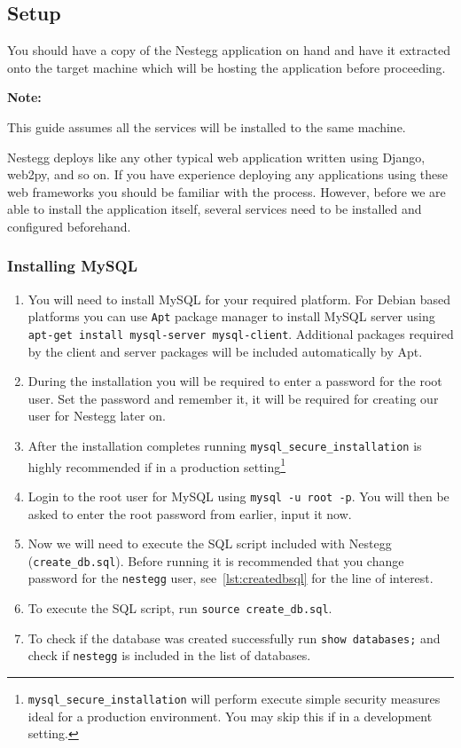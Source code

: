 \documentclass[11pt]{article}
\newcommand{\cmd}[1]{\textcolor{code}{\texttt{#1}}}
\newcommand\note[1]{
	\vspace{12pt}
	
	\begin{centering}
	\hfill
	\fcolorbox{black}{light-gray} 
    {
    \begin{minipage}{\textwidth}
    \vspace{4pt}
    	\textbf{Note:}
    	\vspace{8pt}
    	
    	#1
    \vspace{4pt}
    \end{minipage}
    }
    \hfill
    \end{centering}
    
    \vspace{12pt}
}
\begin{document}
		\subsection{Setup}
			You should have a copy of the Nestegg application on hand and have it extracted onto the target machine which will be hosting the application before proceeding.
			
			\note{This guide assumes all the services will be installed to the same machine.}
			Nestegg deploys like any other typical web application written using Django, web2py, and so on. If you have experience deploying any applications using these web frameworks you should be familiar with the process. However, before we are able to install the application itself, several services need to be installed and configured beforehand.			
			
			\subsubsection{Installing MySQL}
				\begin{enumerate}
					\item You will need to install MySQL for your required platform. For Debian based platforms you can use \texttt{Apt} package manager to install MySQL server using \cmd{apt-get install mysql-server mysql-client}. Additional packages required by the client and server packages will be included automatically by Apt.
					\item During the installation you will be required to enter a password for the root user. Set the password and remember it, it will be required for creating our user for Nestegg later on.
					\item After the installation completes running \cmd{mysql\_secure\_installation} is highly recommended if in a production setting\footnote{\cmd{mysql\_secure\_installation} will perform execute simple security measures ideal for a production environment. You may skip this if in a development setting.}
					\item Login to the root user for MySQL using \cmd{mysql -u root -p}. You will then be asked to enter the root password from earlier, input it now.
					\item Now we will need to execute the SQL script included with Nestegg (\cmd{create\_db.sql}). Before running it is recommended that you change password for the \cmd{nestegg} user, see~\cref{lst:createdbsql} for the line of interest.
						
					\item To execute the SQL script, run \cmd{source create\_db.sql}.
					\item To check if the database was created successfully run \cmd{show databases;} and check if \cmd{nestegg} is included in the list of databases.
				\end{enumerate}
\end{document}

